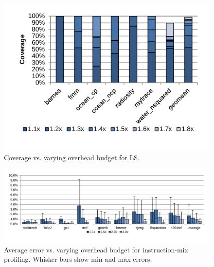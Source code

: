 \begin{figure}
  \begin{center}
    \includegraphics[width=\linewidth, clip=true, trim=0 0.3in 0 0]{figs/data_ls_sweep.pdf}
    \vspace{-0.2in}
    \caption{Coverage vs. varying overhead budget for LS.}
    \label{fig:evaluation.ls_sweep}
    \vspace{-0.1in}
  \end{center}
\end{figure}

\begin{figure}
  \begin{center}
    \includegraphics[width=\linewidth, clip=true, trim=0 0.3in 0 0]{figs/data_imp_sweep.pdf}
    \vspace{-0.2in}
    \caption{Average error vs. varying overhead budget for instruction-mix profiling. Whisker bars show min and max errors.}
    \label{fig:evaluation.imp_sweep}
    \vspace{-0.1in}
  \end{center}
\end{figure}

